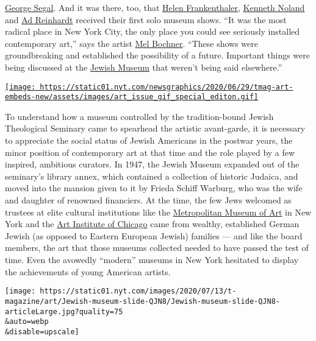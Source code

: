 \href{https://www.nytimes.com/2000/06/10/arts/george-segal-pop-sculptor-dies-at-75-molded-plaster-people-of-a-ghostly-angst.html}{George
Segal}. And it was there, too, that
\href{https://www.nytimes.com/2011/12/28/arts/helen-frankenthaler-abstract-painter-dies-at-83.html}{Helen
Frankenthaler},
\href{https://www.nytimes.com/2010/01/06/arts/06noland.html}{Kenneth
Noland} and \href{https://www.nytimes.com/topic/person/ad-reinhardt}{Ad
Reinhardt} received their first solo museum shows. ``It was the most
radical place in New York City, the only place you could see seriously
installed contemporary art,'' says the artist
\href{https://www.nytimes.com/2019/11/26/t-magazine/mel-bochner.html}{Mel
Bochner}. ``These shows were groundbreaking and established the
possibility of a future. Important things were being discussed at the
\href{https://www.nytimes.com/topic/organization/jewish-museum-nyc}{Jewish
Museum} that weren't being said elsewhere.''

\href{https://www.nytimes.com/issue/t-magazine/2020/07/02/true-believers-art-issue}{\texttt{[image: https://static01.nyt.com/newsgraphics/2020/06/29/tmag-art-embeds-new/assets/images/art\_issue\_gif\_special\_editon.gif]}}

To understand how a museum controlled by the tradition-bound Jewish
Theological Seminary came to spearhead the artistic avant-garde, it is
necessary to appreciate the social status of Jewish Americans in the
postwar years, the minor position of contemporary art at that time and
the role played by a few inspired, ambitious curators. In 1947, the
Jewish Museum expanded out of the seminary's library annex, which
contained a collection of historic Judaica, and moved into the mansion
given to it by Frieda Schiff Warburg, who was the wife and daughter of
renowned financiers. At the time, the few Jews welcomed as trustees at
elite cultural institutions like the
\href{https://www.nytimes.com/topic/organization/metropolitan-museum-of-art}{Metropolitan
Museum of Art} in New York and the
\href{https://www.nytimes.com/topic/organization/art-institute-of-chicago}{Art
Institute of Chicago} came from wealthy, established German Jewish (as
opposed to Eastern European Jewish) families --- and like the board
members, the art that those museums collected needed to have passed the
test of time. Even the avowedly ``modern'' museums in New York hesitated
to display the achievements of young American artists.

\texttt{[image: https://static01.nyt.com/images/2020/07/13/t-magazine/art/Jewish-museum-slide-QJN8/Jewish-museum-slide-QJN8-articleLarge.jpg?quality=75\\\&auto=webp\\\&disable=upscale]}


